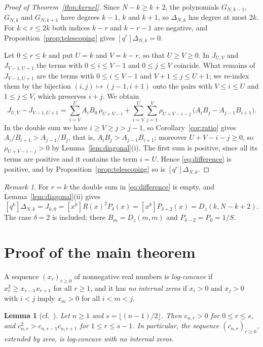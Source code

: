 \documentclass{amsart}
\newtheorem{lemma}[theorem]{Lemma}
\theoremstyle{definition}
\theoremstyle{remark}
\newtheorem{remark}[theorem]{Remark}
\numberwithin{equation}{section}
\numberwithin{table}{section}
\newcommand{\Dz}{D_z}
\newcommand{\coef}[1]{[#1]}
\begin{document}
\begin{proof}[Proof of Theorem~\ref{thm:kernel}]
Since $N-k\ge k+2$, the polynomials $G_{N,k-1}$, $G_{N,k}$ and $G_{N,k+1}$ have degrees $k-1$, $k$ and $k+1$, so $\Delta_{N,k}$ has degree at most $2k$. For $k<r\le 2k$ both indices $k-r$ and $k-r-1$ are negative, and Proposition~\ref{prop:telescoping} gives $\coef{q^r}\Delta_{N,k}=0$.

Let $0\le r\le k$ and put $U=k$ and $V=k-r$, so that $U\ge V\ge 0$. In $J_{U,V}$ and $J_{V-1,U+1}$ the terms with $0\le i\le V-1$ and $0\le j\le V$ coincide. What remains of $J_{V-1,U+1}$ are the terms with $0\le i\le V-1$ and $V+1\le j\le U+1$; we re-index them by the bijection $(i,j)\mapsto(j-1,i+1)$ onto the pairs with $V\le i\le U$ and $1\le j\le V$, which preserves $i+j$. We obtain
\begin{equation}\label{eq:difference}
J_{U,V}-J_{V-1,U+1}=\sum_{i=V}^{U}A_iB_0\,\rho_{U+V-i}+\sum_{i=V}^{U}\sum_{j=1}^{V}\rho_{U+V-i-j}\,\bigl(A_iB_j-A_{j-1}B_{i+1}\bigr).
\end{equation}
In the double sum we have $i\ge V\ge j>j-1$, so Corollary~\ref{cor:ratio} gives $A_i/B_{i+1}>A_{j-1}/B_j$, that is, $A_iB_j>A_{j-1}B_{i+1}$; moreover $U+V-i-j\ge 0$, so $\rho_{U+V-i-j}>0$ by Lemma~\ref{lem:diagonal}(i). The first sum is positive, since all its terms are positive and it contains the term $i=U$. Hence \eqref{eq:difference} is positive, and by Proposition~\ref{prop:telescoping} so is $\coef{q^r}\Delta_{N,k}$.
\end{proof}

\begin{remark}\label{rem:top}
For $r=k$ the double sum in \eqref{eq:difference} is empty, and Lemma~\ref{lem:diagonal}(ii) gives
\[
\coef{q^k}\Delta_{N,k}=J_{k,0}=\coef{x^k}R(x)^2P_\delta(x)=\coef{x^k}P_{\delta+2}(x)=\Dz(k,N-k+2).
\]
The case $\delta=2$ is included; there $B_m=\Dz(m,m)$ and $P_{\delta-2}=P_0=1/S$.
\end{remark}

\section{Proof of the main theorem}\label{sec:proof}

A sequence $(x_r)_{r\ge 0}$ of nonnegative real numbers is \emph{log-concave} if $x_r^2\ge x_{r-1}x_{r+1}$ for all $r\ge 1$, and it has \emph{no internal zeros} if $x_i>0$ and $x_j>0$ with $i<j$ imply $x_m>0$ for all $i<m<j$.

\begin{lemma}[{cf.\ \cite[Theorem~1.2]{GLL}}]\label{lem:weights}
Let $n\ge 1$ and $s=\lfloor (n-1)/2\rfloor$. Then $c_{n,r}>0$ for $0\le r\le s$, and $c_{n,r}^2>c_{n,r-1}c_{n,r+1}$ for $1\le r\le s-1$. In particular, the sequence $(c_{n,r})_{r\ge 0}$, extended by zero, is log-concave with no internal zeros.
\end{lemma}
\end{document}
